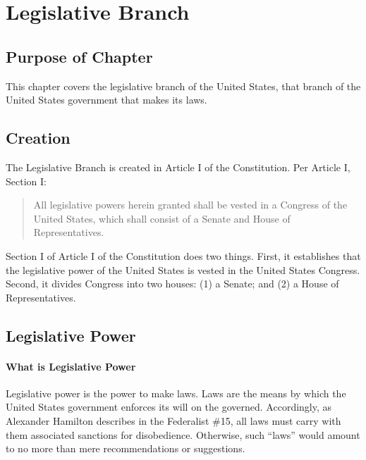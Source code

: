 %
%
%
%
%
%

\chapter{Legislative Branch}

\section {Purpose of Chapter}
This chapter covers the legislative branch of the United States, that branch of the United States government that makes its laws.

\section{Creation}
The Legislative Branch is created in Article I of the Constitution.  Per Article I, Section I:

\begin{quote}
All legislative powers herein granted shall be vested in a Congress of the United States, which shall consist of 
a Senate and House of Representatives.
\end{quote}

Section I of Article I of the Constitution does two things.  First, it establishes that the legislative power of the United States is vested in the United States Congress.  Second, it divides Congress into two houses: (1) a Senate; and (2) a House of Representatives.

\section{Legislative Power}

\subsubsection{What is Legislative Power}
Legislative power is the power to make laws.  Laws are the means by which the United States government enforces its will on the governed.  Accordingly, as Alexander Hamilton describes in the Federalist \#15, all laws must carry with them associated sanctions for disobedience.  Otherwise, such ``laws'' would amount to no more than mere recommendations or suggestions.

